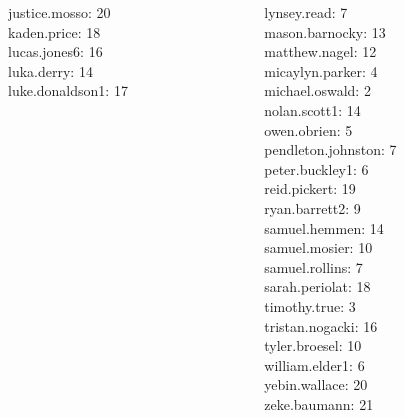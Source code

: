 \documentclass[10pt]{beamer}
\begin{document}
\begin{frame}
\begin{columns}
\begin{column}{0.33\textwidth}
justice.mosso: 20 \\ 
kaden.price: 18 \\ 
lucas.jones6: 16 \\ 
luka.derry: 14 \\ 
luke.donaldson1: 17 \\\end{column}
\begin{column}{0.33\textwidth}
lynsey.read: 7 \\ 
mason.barnocky: 13 \\ 
matthew.nagel: 12 \\ 
micaylyn.parker: 4 \\ 
michael.oswald: 2 \\ 
nolan.scott1: 14 \\ 
owen.obrien: 5 \\ 
pendleton.johnston: 7 \\ 
peter.buckley1: 6 \\ 
reid.pickert: 19 \\ 
ryan.barrett2: 9 \\ 
samuel.hemmen: 14 \\ 
samuel.mosier: 10 \\ 
samuel.rollins: 7 \\ 
sarah.periolat: 18 \\ 
timothy.true: 3 \\ 
tristan.nogacki: 16 \\ 
tyler.broesel: 10 \\ 
william.elder1: 6 \\ 
yebin.wallace: 20 \\ 
zeke.baumann: 21 \\\end{column}
\end{columns}
\vfill
\end{frame}
\end{document}
